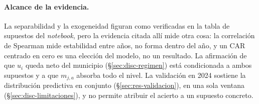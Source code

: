 \paragraph{Alcance de la evidencia.} La separabilidad y la exogeneidad figuran
como verificadas en la tabla de supuestos del \emph{notebook}, pero la evidencia
citada allí mide otra cosa: la correlación de Spearman mide estabilidad entre
años, no forma dentro del año, y un CAR centrado en cero es una elección del
modelo, no un resultado. La afirmación de que $u_i$ queda neto del municipio
(§\ref{sec:disc-regimen}) está condicionada a ambos supuestos y a que $m_{j,a}$
absorba todo el nivel. La validación en 2024 sostiene la distribución predictiva
en conjunto (§\ref{sec:res-validacion}), en una sola ventana
(§\ref{sec:disc-limitaciones}), y no permite atribuir el acierto a un supuesto
concreto.
